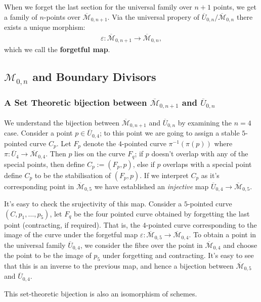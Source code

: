 When we forget the last section for the universal family over $n+1$ points, we get a family of $n$-points over $\overline{\mathcal{M}}_{0,n+1}$. 
Via the universal propery of $\overline{U}_{0,n}/\overline{\mathcal{M}}_{0,n}$ there exists a unique morphism:
\begin{align*}
    \varepsilon : \overline{\mathcal{M}}_{0,n+1} \to \overline{\mathcal{M}}_{0,n},
\end{align*}
which we call the \textbf{forgetful map}.
 
\subsection{$\mathcal{M}_{0,n}$ and Boundary Divisors}

\subsubsection{A Set Theoretic bijection between $\overline{\mathcal{M}}_{0,n+1}$ and $\overline{U}_{0,n}$}
We understand the bijection between $\overline{\mathcal{M}}_{0,n+1}$ and $\overline{U}_{0,n}$ by examining the $n=4$ case.
Consider a point $p \in \overline{U}_{0,4}$; to this point we are going to assign a stable $5$-pointed curve $C_{p}$.
Let $F_{p}$ denote the $4$-pointed curve $\pi^{-1}(\pi(p))$ where $\pi: \overline{U}_{4} \to \overline{\mathcal{M}}_{0,4}$.
Then $p$ lies on the curve $F_{q}$; if $p$ doesn't overlap with any of the special points, then define $C_{p} := (F_{p},p)$, else if $p$ overlaps with a special point define $C_{p}$ to be the stabilisation of $(F_{p},p)$.
If we interpret $C_{p}$ as it's corresponding point in $\overline{\mathcal{M}}_{0,5}$ we have established an \textit{injective} map $\overline{U}_{0,4} \to \overline{\mathcal{M}}_{0,5}$.
\par It's easy to check the srujectivity of this map.
Consider a $5$-pointed curve $(C,p_{1},\dots, p_{5})$, let $F_{q}$ be the four pointed curve obtained by forgetting the last point (contracting, if required).
That is, the $4$-pointed curve corresponding to the image of the curve under the forgetful map $\varepsilon : \overline{\mathcal{M}}_{0,5}\to \overline{\mathcal{M}}_{0,4}$.
To obtain a point in the universal family $\overline{U}_{0,4}$, we consider the fibre over the point in $\overline{\mathcal{M}}_{0,4}$ and choose the point to be the image of $p_{5}$ under forgetting and contracting. 
It's easy to see that this is an inverse to the previous map, and hence a bijection between $\overline{\mathcal{M}}_{0,5}$ and $\overline{U}_{0,4}$.
\par This set-theoretic bijection is also an isomorphism of schemes.

